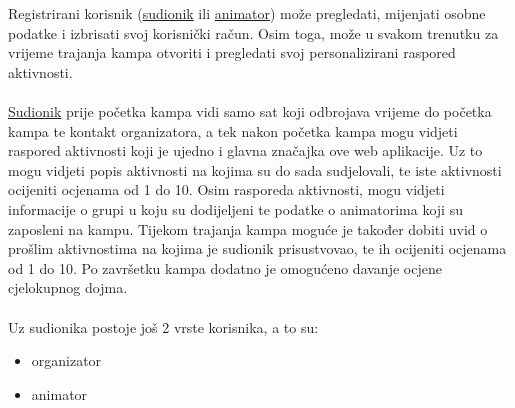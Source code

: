     Registrirani korisnik (\underline{sudionik} ili \underline{animator}) može pregledati, mijenjati osobne podatke i izbrisati svoj korisnički račun. Osim toga, može u svakom trenutku za vrijeme trajanja kampa otvoriti i pregledati svoj personalizirani raspored aktivnosti.\\
    \\
    \underline{Sudionik} prije početka kampa vidi samo sat koji odbrojava vrijeme do početka kampa te kontakt organizatora, a tek nakon početka kampa mogu vidjeti raspored aktivnosti koji je ujedno i glavna značajka ove web aplikacije. Uz to mogu vidjeti popis aktivnosti na kojima su do sada sudjelovali, te iste aktivnosti ocijeniti ocjenama od 1 do 10. Osim rasporeda aktivnosti, mogu vidjeti informacije o grupi u koju su dodijeljeni te podatke o animatorima koji su zaposleni na kampu. Tijekom trajanja kampa moguće je također dobiti uvid o prošlim aktivnostima na kojima je sudionik prisustvovao, te ih ocijeniti ocjenama od 1 do 10. Po završetku kampa dodatno je omogućeno davanje ocjene cjelokupnog dojma.\\
    \\
    Uz sudionika postoje još 2 vrste korisnika, a to su:
    \begin{itemize}
        \item organizator
        \item animator\\
    \end{itemize}
    
    

